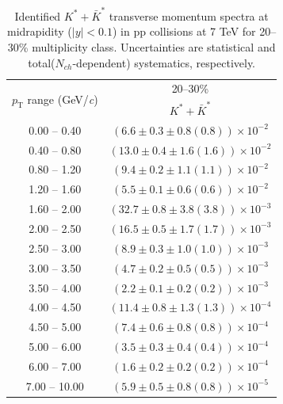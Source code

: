 \begin{table}
\caption{Identified $K^{*} + \bar{K}^{*}$ transverse momentum spectra at midrapidity ($|y|<0.1$) in pp collisions at 7 TeV for 20--30\% multiplicity class. Uncertainties are statistical and total($N_{ch}$-dependent) systematics, respectively.}
\label{tab:KStar_20to30}
\begin{center}
\begin{tabular}{ c | c }
\hline
\multirow{2}{*}{$p_{\mathrm{T}}$ range (GeV/\textit{c})} & \multicolumn{1}{c}{20--30\%} \\ & $K^{*} + \bar{K}^{*}$\\ 
\hline
0.00 -- 0.40 & $(6.6\pm0.3\pm0.8(0.8))\times10^{-2}$ \\ 
0.40 -- 0.80 & $(13.0\pm0.4\pm1.6(1.6))\times10^{-2}$ \\ 
0.80 -- 1.20 & $(9.4\pm0.2\pm1.1(1.1))\times10^{-2}$ \\ 
1.20 -- 1.60 & $(5.5\pm0.1\pm0.6(0.6))\times10^{-2}$ \\ 
1.60 -- 2.00 & $(32.7\pm0.8\pm3.8(3.8))\times10^{-3}$ \\ 
2.00 -- 2.50 & $(16.5\pm0.5\pm1.7(1.7))\times10^{-3}$ \\ 
2.50 -- 3.00 & $(8.9\pm0.3\pm1.0(1.0))\times10^{-3}$ \\ 
3.00 -- 3.50 & $(4.7\pm0.2\pm0.5(0.5))\times10^{-3}$ \\ 
3.50 -- 4.00 & $(2.2\pm0.1\pm0.2(0.2))\times10^{-3}$ \\ 
4.00 -- 4.50 & $(11.4\pm0.8\pm1.3(1.3))\times10^{-4}$ \\ 
4.50 -- 5.00 & $(7.4\pm0.6\pm0.8(0.8))\times10^{-4}$ \\ 
5.00 -- 6.00 & $(3.5\pm0.3\pm0.4(0.4))\times10^{-4}$ \\ 
6.00 -- 7.00 & $(1.6\pm0.2\pm0.2(0.2))\times10^{-4}$ \\ 
7.00 -- 10.00 & $(5.9\pm0.5\pm0.8(0.8))\times10^{-5}$ \\ 
\hline
\end{tabular}
\end{center}
\end{table}
 

